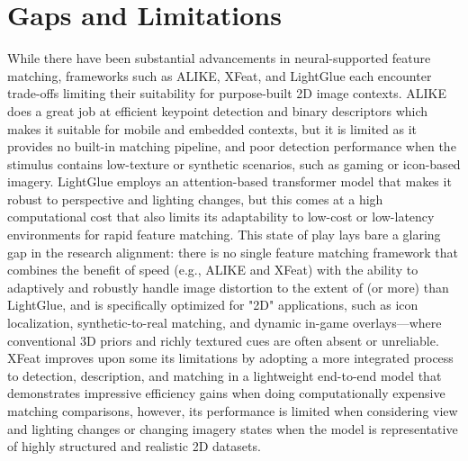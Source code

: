 \section{Gaps and Limitations}
While there have been substantial advancements in neural-supported feature matching, frameworks such as ALIKE, XFeat, and LightGlue each encounter trade-offs limiting their suitability for purpose-built 2D image contexts. ALIKE does a great job at efficient keypoint detection and binary descriptors which makes it suitable for mobile and embedded contexts, but it is limited as it provides no built-in matching pipeline, and poor detection performance when the stimulus contains low-texture or synthetic scenarios, such as gaming or icon-based imagery. LightGlue employs an attention-based transformer model that makes it robust to perspective and lighting changes, but this comes at a high computational cost that also limits its adaptability to low-cost or low-latency environments for rapid feature matching. This state of play lays bare a glaring gap in the research alignment: there is no single feature matching framework that combines the benefit of speed (e.g., ALIKE and XFeat) with the ability to adaptively and robustly handle image distortion to the extent of (or more) than LightGlue, and is specifically optimized for "2D" applications, such as icon localization, synthetic-to-real matching, and dynamic in-game overlays—where conventional 3D priors and richly textured cues are often absent or unreliable. XFeat improves upon some its limitations by adopting a more integrated process to detection, description, and matching in a lightweight end-to-end model that demonstrates impressive efficiency gains when doing computationally expensive matching comparisons, however, its performance is limited when considering view and lighting changes or changing imagery states when the model is representative of highly structured and realistic 2D datasets.